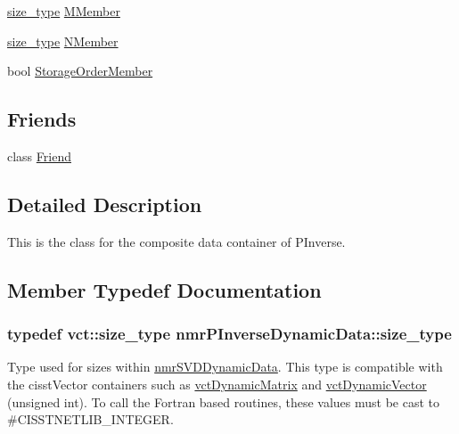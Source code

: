 {\bf }\par
\begin{DoxyCompactItemize}
\item 
\hyperlink{classnmr_p_inverse_dynamic_data_a059041cc0fb800515bffe5bb351b01cb}{size\-\_\-type} \hyperlink{classnmr_p_inverse_dynamic_data_a747c7b9fb8208d7a1a1b780e5fb0fb55}{M\-Member}
\item 
\hyperlink{classnmr_p_inverse_dynamic_data_a059041cc0fb800515bffe5bb351b01cb}{size\-\_\-type} \hyperlink{classnmr_p_inverse_dynamic_data_a1ba9d083e553858b17f7ec109261223e}{N\-Member}
\item 
bool \hyperlink{classnmr_p_inverse_dynamic_data_aa4810eb93febb93966e173a81b32f1ff}{Storage\-Order\-Member}
\end{DoxyCompactItemize}

\subsection*{Friends}
\begin{DoxyCompactItemize}
\item 
class \hyperlink{classnmr_p_inverse_dynamic_data_a7f8321d57e81bc613d5dbef3410ba70e}{Friend}
\end{DoxyCompactItemize}


\subsection{Detailed Description}
This is the class for the composite data container of P\-Inverse. 

\subsection{Member Typedef Documentation}
\hypertarget{classnmr_p_inverse_dynamic_data_a059041cc0fb800515bffe5bb351b01cb}{
\subsubsection[{size\-\_\-type}]{\setlength{\rightskip}{0pt plus 5cm}typedef {\bf vct\-::size\-\_\-type} {\bf nmr\-P\-Inverse\-Dynamic\-Data\-::size\-\_\-type}}}\label{classnmr_p_inverse_dynamic_data_a059041cc0fb800515bffe5bb351b01cb}
Type used for sizes within \hyperlink{classnmr_s_v_d_dynamic_data}{nmr\-S\-V\-D\-Dynamic\-Data}. This type is compatible with the cisst\-Vector containers such as \hyperlink{classvct_dynamic_matrix}{vct\-Dynamic\-Matrix} and \hyperlink{classvct_dynamic_vector}{vct\-Dynamic\-Vector} (unsigned int). To call the Fortran based routines, these values must be cast to \#\-C\-I\-S\-S\-T\-N\-E\-T\-L\-I\-B\-\_\-\-I\-N\-T\-E\-G\-E\-R. 

